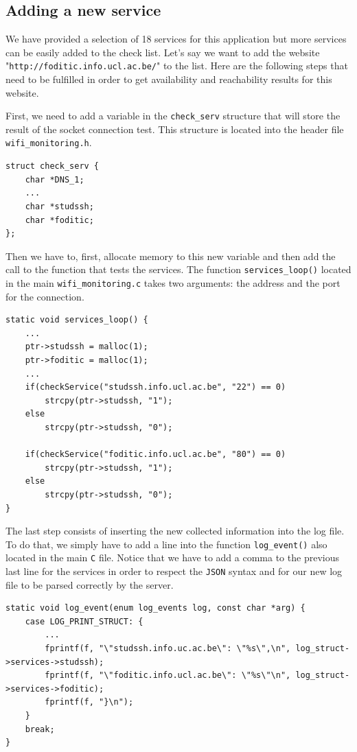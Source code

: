 \subsection*{Adding a new service}
We have provided a selection of 18 services for this application but more services can be easily added to the check list.
Let's say we want to add the website \\"\texttt{http://foditic.info.ucl.ac.be/}" to the list. Here are the following steps that need to be fulfilled in order to get availability and reachability results for this website.

First, we need to add a variable in the \texttt{check\_serv} structure that will store the result of the socket connection test. This structure is located into the header file \texttt{wifi\_monitoring.h}.\\

\begin{lstlisting}[frame=single,breaklines=true]
struct check_serv {
	char *DNS_1;
	...
	char *studssh;
	char *foditic;
};
\end{lstlisting}

Then we have to, first, allocate memory to this new variable and then add the call to the function that tests the services. The function \texttt{services\_loop()} located in the main \texttt{wifi\_monitoring.c} takes two arguments: the address and the port for the connection.\\

\begin{lstlisting}[frame=single,breaklines=true]
static void services_loop() {
	...
	ptr->studssh = malloc(1);
	ptr->foditic = malloc(1);
	...
	if(checkService("studssh.info.ucl.ac.be", "22") == 0)
		strcpy(ptr->studssh, "1");
	else
		strcpy(ptr->studssh, "0");

	if(checkService("foditic.info.ucl.ac.be", "80") == 0)
		strcpy(ptr->studssh, "1");
	else
		strcpy(ptr->studssh, "0");
}
\end{lstlisting}

The last step consists of inserting the new collected information into the log file. To do that, we simply have to add a line into the function \texttt{log\_event()} also located in the main \texttt{C} file. Notice that we have to add a comma to the previous last line for the services in order to respect the \texttt{JSON} syntax and for our new log file to be parsed correctly by the server.\\

\begin{lstlisting}[frame=single,breaklines=true]
static void log_event(enum log_events log, const char *arg) {
	case LOG_PRINT_STRUCT: {
		...
		fprintf(f, "\"studssh.info.uc.ac.be\": \"%s\",\n", log_struct->services->studssh);
		fprintf(f, "\"foditic.info.ucl.ac.be\": \"%s\"\n", log_struct->services->foditic);
		fprintf(f, "}\n");
	}
	break;
}
\end{lstlisting}


